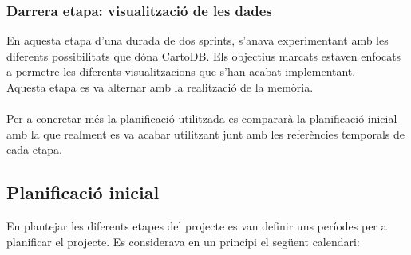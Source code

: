 \documentclass[12pt,a4paper,openright,oneside]{article}
\numberwithin{equation}{section}
\theoremstyle{definition}
\begin{document}
\subsubsection*{Darrera etapa: visualització de les dades}
En aquesta etapa d'una durada de dos sprints, s'anava experimentant amb les diferents possibilitats que dóna CartoDB. Els objectius marcats estaven enfocats a permetre les diferents visualitzacions que s'han acabat implementant.\\
Aquesta etapa es va alternar amb la realització de la memòria.\\\\
Per a concretar més la planificació utilitzada es compararà la planificació inicial amb la que realment es va acabar utilitzant junt amb les referències temporals de cada etapa.
\subsection{Planificació inicial}
En plantejar les diferents etapes del projecte es van definir uns períodes per a planificar el projecte. Es considerava en un principi el següent calendari:
\end{document}
